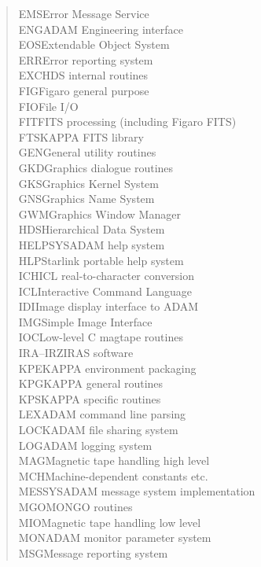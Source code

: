 \documentclass[twoside,11pt]{article}
\renewcommand{\_}{{\tt\char'137}}
\begin{document}
\begin{quote}
\begin{tabbing}
EMS\>Error Message Service\\
ENG\>ADAM Engineering interface\\
EOS\>Extendable Object System\\
ERR\>Error reporting system\\
EXC\>HDS internal routines\\
FIG\>Figaro general purpose\\
FIO\>File I/O\\
FIT\>FITS processing (including Figaro FITS)\\
FTS\>KAPPA FITS library\\
GEN\>General utility routines\\
GKD\>Graphics dialogue routines\\
GKS\>Graphics Kernel System\\
GNS\>Graphics Name System\\
GWM\>Graphics Window Manager\\
HDS\>Hierarchical Data System\\
HELPSYS\>ADAM help system\\
HLP\>Starlink portable help system\\
ICH\>ICL real-to-character conversion\\
ICL\>Interactive Command Language\\
IDI\>Image display interface to ADAM\\
IMG\>Simple Image Interface\\
IOC\>Low-level C magtape routines\\
IRA--IRZ\>IRAS software\\
KPE\>KAPPA environment packaging\\
KPG\>KAPPA general routines\\
KPS\>KAPPA specific routines\\
LEX\>ADAM command line parsing\\
LOCK\>ADAM file sharing system\\
LOG\>ADAM logging system\\
MAG\>Magnetic tape handling high level\\
MCH\>Machine-dependent constants etc.\\
MESSYS\>ADAM message system implementation\\
MGO\>MONGO routines\\
MIO\>Magnetic tape handling low level\\
MON\>ADAM monitor parameter system\\
MSG\>Message reporting system\\

\end{tabbing}
\end{quote}
\end{document}
